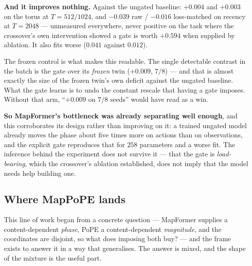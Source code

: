 \documentclass[11pt]{article}
\begin{document}
\textbf{And it improves nothing.} Against the ungated baseline: $+0.004$ and $+0.003$
on the torus at $T=512/1024$, and $-0.039$ raw / $-0.016$ loss-matched on recency at
$T=2048$ --- unmeasured everywhere, never positive on the task where the crossover's
own intervention showed a gate is worth $+0.594$ when supplied by ablation. It also
fits worse ($0.041$ against $0.012$).

The frozen control is what makes this readable. The single detectable contrast in the
batch is the gate over its \emph{frozen} twin ($+0.009$, $7/8$) --- and that is almost
exactly the size of the frozen twin's own deficit against the ungated baseline. What
the gate learns is to undo the constant rescale that having a gate imposes. Without
that arm, ``$+0.009$ on $7/8$ seeds'' would have read as a win.

\textbf{So MapFormer's bottleneck was already separating well enough}, and this
corroborates its design rather than improving on it: a trained ungated model already
moves the phase about five times more on actions than on observations, and the
explicit gate reproduces that for $258$ parameters and a worse fit. The inference
behind the experiment does not survive it --- that the gate is \emph{load-bearing},
which the crossover's ablation established, does not imply that the model needs help
building one.

\subsection{Where MapPoPE lands}
\label{sec:mappope}

This line of work began from a concrete question --- MapFormer supplies a
content-dependent \emph{phase}, PoPE a content-dependent \emph{magnitude}, and the
coordinates are disjoint, so what does imposing both buy? --- and the frame exists
to answer it in a way that generalises. The answer is mixed, and the shape of the
mixture is the useful part.
\end{document}
